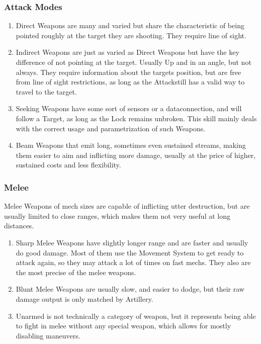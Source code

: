 \subsubsection{Attack Modes}
\begin{enumerate}[label= -]
    \item {Direct} Weapons are many and varied but share the characteristic of being pointed roughly at
    the target they are shooting.
    They require line of sight.
    \item {Indirect} Weapons are just as varied as Direct Weapons but have the key difference
    of not pointing at the target.
    Usually Up and in an angle, but not always.
    They require information about the targets position, but are free from line of sight restrictions, as long as
    the Attackstill has a valid way to travel to the target.
    \item {Seeking} Weapons have some sort of sensors or a dataconnection, and will follow a Target, as long as the Lock
    remains unbroken.
    This skill mainly deals with the correct usage and parametrization of such Weapons.
    \item {Beam} Weapons that emit long, sometimes even sustained streams, making them easier to aim
    and inflicting more damage, usually at the price of higher, sustained costs and less flexibility.
\end{enumerate}
\subsubsection{Melee}
Melee Weapons of mech sizes are capable of inflicting utter destruction, but are usually
limited to close ranges, which makes them not very useful at long distances.
\begin{enumerate}[label= -]
    \item {Sharp} Melee Weapons have slightly longer range and are faster and usually do good damage.
    Most of them use the Movement System to get ready to attack again, so they may attack a lot of times on fast mechs.
    They also are the most precise of the melee weapons.
    \item {Blunt} Melee Weapons are usually slow, and easier to dodge, but their raw damage output is only
    matched by Artillery.
    \item {Unarmed} is not technically a category of weapon, but it represents being able to fight in melee
    without any special weapon, which allows for mostly disabling maneuvers.
\end{enumerate}
